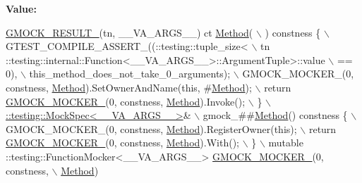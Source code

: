 {\bfseries Value\+:}
\begin{DoxyCode}
\hyperlink{gmock-generated-function-mockers_8h_a0e9d94e9c77df84f1103af06feee1077}{GMOCK\_RESULT\_}(tn, \_\_VA\_ARGS\_\_) ct \hyperlink{gmock-spec-builders__test_8cc_a95606368148f3e5aab5db46c32466afd}{Method}( \(\backslash\)
      ) constness \{ \(\backslash\)
    GTEST\_COMPILE\_ASSERT\_((::testing::tuple\_size<                          \(\backslash\)
        tn ::testing::internal::Function<\_\_VA\_ARGS\_\_>::ArgumentTuple>::value \(\backslash\)
            == 0), \(\backslash\)
        this\_method\_does\_not\_take\_0\_arguments); \(\backslash\)
    GMOCK\_MOCKER\_(0, constness, \hyperlink{gmock-spec-builders__test_8cc_a95606368148f3e5aab5db46c32466afd}{Method}).SetOwnerAndName(\textcolor{keyword}{this}, #\hyperlink{gmock-spec-builders__test_8cc_a95606368148f3e5aab5db46c32466afd}{Method}); \(\backslash\)
    return \hyperlink{gmock-generated-function-mockers_8h_a7d362499e27b1bc3a9806dd3cf58a5b7}{GMOCK\_MOCKER\_}(0, constness, \hyperlink{gmock-spec-builders__test_8cc_a95606368148f3e5aab5db46c32466afd}{Method}).Invoke(); \(\backslash\)
  \} \(\backslash\)
  \hyperlink{classtesting_1_1internal_1_1_mock_spec}{::testing::MockSpec<\_\_VA\_ARGS\_\_>}& \(\backslash\)
      gmock\_##\hyperlink{gmock-spec-builders__test_8cc_a95606368148f3e5aab5db46c32466afd}{Method}() constness \{ \(\backslash\)
    GMOCK\_MOCKER\_(0, constness, \hyperlink{gmock-spec-builders__test_8cc_a95606368148f3e5aab5db46c32466afd}{Method}).RegisterOwner(\textcolor{keyword}{this}); \(\backslash\)
    return \hyperlink{gmock-generated-function-mockers_8h_a7d362499e27b1bc3a9806dd3cf58a5b7}{GMOCK\_MOCKER\_}(0, constness, \hyperlink{gmock-spec-builders__test_8cc_a95606368148f3e5aab5db46c32466afd}{Method}).With(); \(\backslash\)
  \} \(\backslash\)
  mutable ::testing::FunctionMocker<\_\_VA\_ARGS\_\_> \hyperlink{gmock-generated-function-mockers_8h_a7d362499e27b1bc3a9806dd3cf58a5b7}{GMOCK\_MOCKER\_}(0, constness, \(\backslash\)
      \hyperlink{gmock-spec-builders__test_8cc_a95606368148f3e5aab5db46c32466afd}{Method})
\end{DoxyCode}
\mbox{\label{gmock-generated-function-mockers_8h_a81a48223a8771de36ef92ac6d56f6e81}} 
